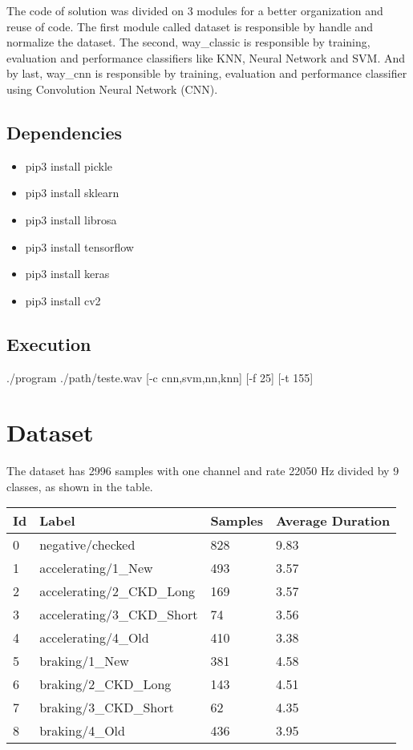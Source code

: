 \documentclass[12pt,oneside,a4paper]{article}
\begin{document}
The code of solution was divided on 3 modules for a better organization and reuse
of code. The first module called dataset is responsible by handle and normalize the dataset.
The second, way\_classic is responsible by training, evaluation and performance
classifiers like KNN, Neural Network and SVM. And by last, way\_cnn is responsible
by training, evaluation and performance classifier using Convolution
Neural Network (CNN).

\subsection{Dependencies}

\begin{itemize}
	\item pip3 install pickle
	\item pip3 install sklearn
	\item pip3 install librosa
	\item pip3 install tensorflow
	\item pip3 install keras
	\item pip3 install cv2
\end{itemize}


\subsection{Execution}

./program ./path/teste.wav [-c cnn,svm,nn,knn] [-f 25] [-t 155]



\section{Dataset}

The dataset has 2996 samples with one channel and rate 22050 Hz divided by 9
classes, as shown in the table.

\begin{table}[] \begin{tabular}{@{}llll@{}}
	\toprule
	Id & Label                      & Samples  & Average Duration \\ \midrule
	0  & negative/checked           & 828      & 9.83             \\
	1  & accelerating/1\_New        & 493      & 3.57             \\
	2  & accelerating/2\_CKD\_Long  & 169      & 3.57             \\
	3  & accelerating/3\_CKD\_Short & 74       & 3.56             \\
	4  & accelerating/4\_Old        & 410      & 3.38             \\
	5  & braking/1\_New             & 381      & 4.58             \\
	6  & braking/2\_CKD\_Long       & 143      & 4.51             \\
	7  & braking/3\_CKD\_Short      & 62       & 4.35             \\
	8  & braking/4\_Old             & 436      & 3.95             \\ \bottomrule
\end{tabular} \end{table}
\end{document}
